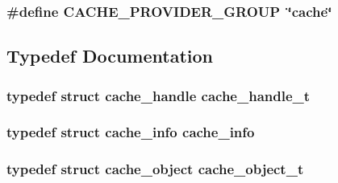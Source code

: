 \subsubsection[{\texorpdfstring{C\+A\+C\+H\+E\+\_\+\+P\+R\+O\+V\+I\+D\+E\+R\+\_\+\+G\+R\+O\+UP}{CACHE_PROVIDER_GROUP}}]{\setlength{\rightskip}{0pt plus 5cm}\#define C\+A\+C\+H\+E\+\_\+\+P\+R\+O\+V\+I\+D\+E\+R\+\_\+\+G\+R\+O\+UP~\char`\"{}cache\char`\"{}}\hypertarget{group__MOD__CACHE_ga4edcab7a404c0fb7333b982cd89c1e1b}{}\label{group__MOD__CACHE_ga4edcab7a404c0fb7333b982cd89c1e1b}


\subsection{Typedef Documentation}
\subsubsection[{\texorpdfstring{cache\+\_\+handle\+\_\+t}{cache_handle_t}}]{\setlength{\rightskip}{0pt plus 5cm}typedef struct {\bf cache\+\_\+handle} {\bf cache\+\_\+handle\+\_\+t}}\hypertarget{group__MOD__CACHE_ga6b7854a2592838a565bdee8f94343aab}{}\label{group__MOD__CACHE_ga6b7854a2592838a565bdee8f94343aab}
\subsubsection[{\texorpdfstring{cache\+\_\+info}{cache_info}}]{\setlength{\rightskip}{0pt plus 5cm}typedef struct {\bf cache\+\_\+info} {\bf cache\+\_\+info}}\hypertarget{group__MOD__CACHE_ga3a1d28907e2c39144e043f20ec80a9b6}{}\label{group__MOD__CACHE_ga3a1d28907e2c39144e043f20ec80a9b6}
\subsubsection[{\texorpdfstring{cache\+\_\+object\+\_\+t}{cache_object_t}}]{\setlength{\rightskip}{0pt plus 5cm}typedef struct {\bf cache\+\_\+object} {\bf cache\+\_\+object\+\_\+t}}\hypertarget{group__MOD__CACHE_gaad2b9c797c4773148b3ff5e1485de21e}{}\label{group__MOD__CACHE_gaad2b9c797c4773148b3ff5e1485de21e}


